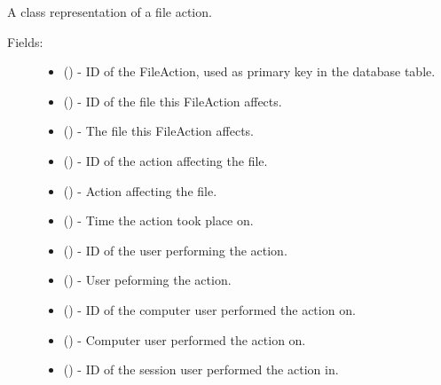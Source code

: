 \documentclass[letterpaper,10pt,english]{sphinxmanual}
\begin{document}
\begin{fulllineitems}
\label{models:models.FileAction}
A class representation of a file action.
\begin{description}
\item[{Fields:}] \leavevmode\begin{itemize}
\item {} 
        ()        - ID of the FileAction, used as primary key in the database table.

\item {} 
        ()        - ID of the file this FileAction affects.

\item {} 
 ()        - The file this FileAction affects.

\item {} 
        ()        - ID of the action affecting the file.

\item {} 
 ()        - Action affecting the file.

\item {} 
        ()        - Time the action took place on.

\item {} 
        ()        - ID of the user performing the action.

\item {} 
 ()        - User peforming the action.

\item {} 
        ()        - ID of the computer user performed the action on.

\item {} 
 ()        - Computer user performed the action on.

\item {} 
        ()        - ID of the session user performed the action in.


\end{itemize}
\end{description}
\end{fulllineitems}
\end{document}
